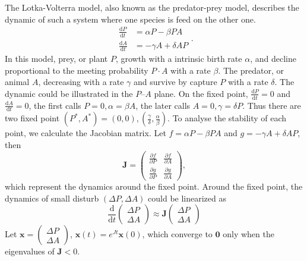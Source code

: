     The Lotka-Volterra model, also known as the predator-prey model, describes the dynamic of such a system where one species is feed on the other one.
    \begin{equation}
        \begin{aligned}
            \frac{\mathrm{d} P}{\mathrm{d}t} &= \alpha P - \beta P A\\
            \frac{\mathrm{d} A}{\mathrm{d}t} &= -\gamma A + \delta A P
        \end{aligned}.
    \end{equation}
    In this model, prey, or plant $P$, growth with a intrinsic birth rate $\alpha$, and decline proportional to the meeting probability $P\cdot A$ with a rate $\beta$. The predator, or animal $A$, decreasing with a rate $\gamma$ and survive by capture $P$ with a rate $\delta$. The dynamic could be illustrated in the $P$--$A$ plane. 
    On the fixed point, $\frac{\mathrm{d} P}{\mathrm{d} t} = 0$ and $\frac{\mathrm{d} A}{\mathrm{d}t} = 0$, the first calls $P = 0, \alpha = \beta A$, the later calls $A = 0, \gamma = \delta P$. Thus there are two fixed point $(P^*, A^*) = (0,0), (\frac{\gamma}{\delta},\frac{\alpha}{\beta})$. To analyse the stability of each point, we calculate the Jacobian matrix. Let $f=\alpha P - \beta P A$ and $g = -\gamma A + \delta A P$, then
    \begin{equation*}
        \bm{J} = \begin{pmatrix}
            \frac{\partial f}{\partial P} & \frac{\partial f}{\partial A}\\
            \frac{\partial g}{\partial P} & \frac{\partial g}{\partial A}
        \end{pmatrix},
    \end{equation*}
    which represent the dynamics around the fixed point. Around the fixed point, the dynamics of small disturb $(\Delta P, \Delta A)$ could be linearized as
    \begin{equation*}
        \frac{\mathrm{d}}{\mathrm{d} t}\begin{pmatrix}
        \Delta P\\ \Delta A
        \end{pmatrix}
        \approx \bm{J} \begin{pmatrix}
        \Delta P\\ \Delta A
        \end{pmatrix}
    \end{equation*}
    Let $\bm{x} = \begin{pmatrix}
        \Delta P\\ \Delta A
        \end{pmatrix}$, $\bm{x}(t) = e^{Jt} \bm{x}(0)$, which converge to $\bm{0}$ only when the eigenvalues of $\bm{J}<0$.
